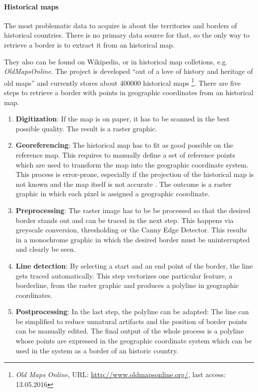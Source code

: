 \paragraph{Historical maps} %
\label{par:historical_map}

The most problematic data to acquire is about the territories and borders of historical countries. There is no primary data source for that, so the only way to retrieve a border is to extract it from an historical map.

They also can be found on Wikipedia, or in historical map colletions, e.g. \emph{OldMapsOnline}. The project is developed ``out of a love of history and heritage of old maps'' and currently stores about 400000 historical maps
\footnote{
  \textit{Old Maps Online},
  URL: \url{http://www.oldmapsonline.org/},
  last access: 13.05.2016
}.
There are five steps to retrieve a border with points in geographic coordinates from an historical map.
\begin{enumerate}
  \item \textbf{Digitization}: If the map is on paper, it has to be scanned in the best possible quality. The result is a raster graphic.
  \item \textbf{Georeferencing}: The historical map has to fit as good possible on the reference map. This requires to manually define a set of reference points which are used to transform the map into the geographic coordinate system. This process is error-prone, especially if the projection of the historical map is not known and the map itself is not accurate
  \cite[pp. xvii]{knowles2002past}.
  The outcome is a raster graphic in which each pixel is assigned a geographic coordinate.
  \item \textbf{Preprocessing}: The raster image has to be be processed so that the desired border stands out and can be traced in the next step. This happens via greyscale conversion, thresholding or the Canny Edge Detector. This results in a monochrome graphic in which the desired border must be uninterrupted and clearly be seen.
  \item \textbf{Line detection}: By selecting a start and an end point of the border, the line gets traced automatically. This step vectorizes one particular feature, a borderline, from the raster graphic and produces a polyline in geographic coordinates.
  \item \textbf{Postprocessing}: In the last step, the polyline can be adapted: The line can be simplified to reduce unnatural artifacts and the position of border points can be manually edited. The final output of the whole process is a polyline whose points are expressed in the geographic coordinate system which can be used in the system as a border of an historic country.
\end{enumerate}

